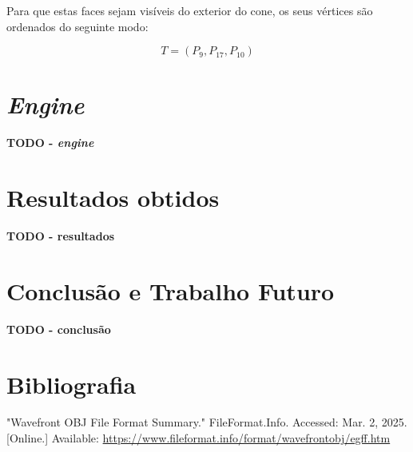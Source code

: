\documentclass[12pt, a4paper]{article}
\begin{document}
Para que estas faces sejam visíveis do exterior do cone, os seus vértices são ordenados do seguinte
modo:

$$
T = (P_9, P_{17}, P_{10})
$$

\section{\emph{Engine}}

\textbf{\color{red} TODO - \emph{engine}}

\section{Resultados obtidos}

\textbf{\color{red} TODO - resultados}

\section{Conclusão e Trabalho Futuro}

\textbf{\color{red} TODO - conclusão}

\begingroup
\section{Bibliografia}
\renewcommand{\section}[2]{}

\begin{thebibliography}{9}
        "Wavefront OBJ File Format Summary."{} FileFormat.Info. Accessed: Mar. 2, 2025. [Online.]
        Available: \url{https://www.fileformat.info/format/wavefrontobj/egff.htm}
\end{thebibliography}
\endgroup
\end{document}
